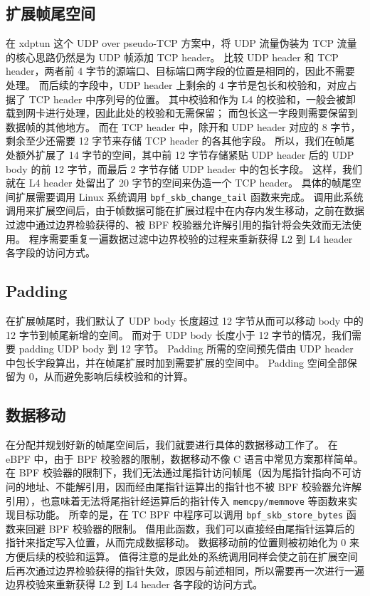 \subsection{扩展帧尾空间}

在 xdptun 这个 UDP over pseudo-TCP 方案中，将 UDP 流量伪装为 TCP 流量的核心思路仍然是为 UDP 帧添加 TCP header。
比较 UDP header 和 TCP header，两者前 4 字节的源端口、目标端口两字段的位置是相同的，因此不需要处理。
而后续的字段中，UDP header 上剩余的 4 字节是包长和校验和，对应占据了 TCP header 中序列号的位置。
其中校验和作为 L4 的校验和，一般会被卸载到网卡进行处理，因此此处的校验和无需保留；
而包长这一字段则需要保留到数据帧的其他地方。
而在 TCP header 中，除开和 UDP header 对应的 8 字节，剩余至少还需要 12 字节来存储 TCP header 的各其他字段。
所以，我们在帧尾处额外扩展了 14 字节的空间，其中前 12 字节存储紧贴 UDP header 后的 UDP body 的前 12 字节，而最后 2 字节存储 UDP header 中的包长字段。
这样，我们就在 L4 header 处留出了 20 字节的空间来伪造一个 TCP header。
具体的帧尾空间扩展需要调用 Linux 系统调用 \texttt{bpf\_skb\_change\_tail} 函数来完成。
调用此系统调用来扩展空间后，由于帧数据可能在扩展过程中在内存内发生移动，之前在数据过滤中通过边界检验获得的、被 BPF 校验器允许解引用的指针将会失效而无法使用。
程序需要重复一遍数据过滤中边界校验的过程来重新获得 L2 到 L4 header 各字段的访问方式。

\subsection{Padding}

在扩展帧尾时，我们默认了 UDP body 长度超过 12 字节从而可以移动 body 中的 12 字节到帧尾新增的空间。
而对于 UDP body 长度小于 12 字节的情况，我们需要 padding UDP body 到 12 字节。
Padding 所需的空间预先借由 UDP header 中包长字段算出，并在帧尾扩展时加到需要扩展的空间中。
Padding 空间全部保留为 0，从而避免影响后续校验和的计算。

\subsection{数据移动}

在分配并规划好新的帧尾空间后，我们就要进行具体的数据移动工作了。
在 eBPF 中，由于 BPF 校验器的限制，数据移动不像 C 语言中常见方案那样简单。
在 BPF 校验器的限制下，我们无法通过尾指针访问帧尾（因为尾指针指向不可访问的地址、不能解引用，因而经由尾指针运算出的指针也不被 BPF 校验器允许解引用），也意味着无法将尾指针经运算后的指针传入 \texttt{memcpy/memmove} 等函数来实现目标功能。
所幸的是，在 TC BPF 中程序可以调用 \texttt{bpf\_skb\_store\_bytes} 函数来回避 BPF 校验器的限制。
借用此函数，我们可以直接经由尾指针运算后的指针来指定写入位置，从而完成数据移动。
数据移动前的位置则被初始化为 0 来方便后续的校验和运算。
值得注意的是此处的系统调用同样会使之前在扩展空间后再次通过边界检验获得的指针失效，原因与前述相同，所以需要再一次进行一遍边界校验来重新获得 L2 到 L4 header 各字段的访问方式。

